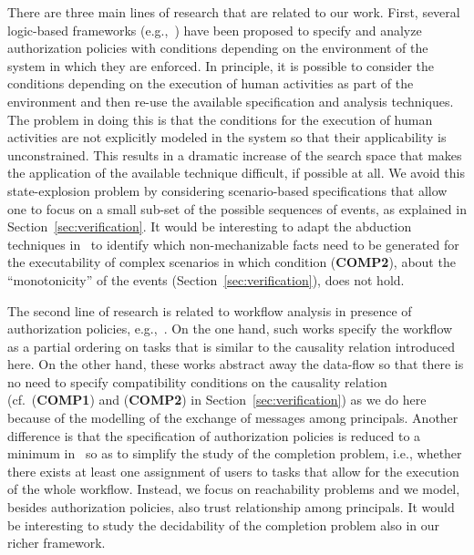 \documentclass[conference]{llncs}
\begin{document}
{There are three main lines of research that are related to our work. 
First, several logic-based frameworks
(e.g.,~\cite{lietal2005,GurevichNeeman-dkal,becker,hurlin,asiaccs11,jsc-ftp09})
have been proposed to specify and analyze authorization policies with
conditions depending on the environment of the system in which they
are enforced.  In principle, it is possible to consider the conditions
depending on the execution of human activities as part of the
environment and then re-use the available specification and analysis
techniques.  The problem in doing this is that the conditions for the
execution of human activities are not explicitly modeled in the
system so that their applicability is unconstrained. This results in
a dramatic increase of the search space that makes the application of
the available technique difficult, if possible at all.  We avoid this
state-explosion problem by considering scenario-based specifications
that allow one to focus on a small sub-set of the possible sequences of
events, as explained in Section~\ref{sec:verification}.  It would be
interesting to adapt the abduction techniques
in~\cite{becker-abd,hurlin} to identify which non-mechanizable facts
need to be generated for the executability of complex scenarios in
which condition (\textbf{COMP2}), about the ``monotonicity'' of the
events (Section~\ref{sec:verification}), does not hold.

The second line of research is related to workflow analysis in
presence of authorization policies, e.g.,~\cite{pacibertino,crampton}.
On the one hand, such works specify the workflow as a partial ordering
on tasks that is similar to the causality relation introduced here.
On the other hand, these works abstract away the data-flow so that
there is no need to specify compatibility conditions on the causality
relation (cf.~(\textbf{COMP1}) and (\textbf{COMP2}) in
Section~\ref{sec:verification}) as we do here because of the modelling
of the exchange of messages among principals.  Another difference is
that the specification of authorization policies is reduced to a
minimum in~\cite{pacibertino,crampton} so as to simplify the study of
the completion problem, i.e., whether there exists at least one
assignment of users to tasks that allow for the execution of the whole
workflow.  Instead, we focus on reachability problems and we model,
besides authorization policies, also trust relationship among
principals.  It would be interesting to study the decidability of the
completion problem also in our richer framework.  

}
\end{document}
